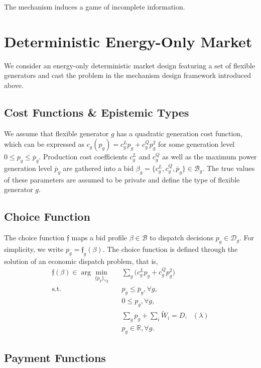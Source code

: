 \documentclass{article}
\begin{document}
The mechanism induces a game of incomplete information.

\section{Deterministic Energy-Only Market}

We consider an energy-only deterministic market design featuring a set of flexible generators and cast the problem in the mechanism design framework introduced above.

\subsection{Cost Functions \& Epistemic Types}

We assume that flexible generator $g$ has a quadratic generation cost function, which can be expressed as $c_g(p_g) = c_g^L p_g + c_g^Q p_g^2$ for some generation level $0 \le p_g \le \overline{p}_g$. Production cost coefficients $c_g^L$ and $c_g^Q$ as well as the maximum power generation level $\overline{p}_g$ are gathered into a bid $\beta_g = \{c_g^L, c_g^Q, \overline{p}_g\} \in \mathcal{B}_g$. The true values of these parameters are assumed to be private and define the type of flexible generator $g$. 

\subsection{Choice Function}

The choice function $\mathfrak{f}$ maps a bid profile $\beta \in \mathcal{B}$ to dispatch decisions $p_g \in \mathcal{D}_g$. For simplicity, we write $p_g = \mathfrak{f}_g(\beta)$. The choice function is defined through the solution of an economic dispatch problem, that is,
\begin{align}
\mathfrak{f}(\beta) \in \arg \underset{\{p_g\}_{\forall g}}{\min} \hspace{10pt} & \sum_g \Big(c_g^Lp_g + c_g^Q p_g^2 \Big)\\
\mbox{s.t. } & p_g \le \overline{p}_g,\forall g,\\
& 0 \le p_g,\forall g,\\
& \sum_g p_g + \sum_i \tilde{W}_i = D, \mbox{ } (\lambda)\\
& p_g \in \mathbb{R}, \forall g.
\end{align}

\subsection{Payment Functions}
\end{document}
